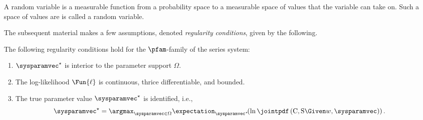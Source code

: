 \documentclass[../main.tex]{subfiles}
\begin{document}

A random variable is a measurable function from a probability space to a measurable space of values that the variable can take on.
Such a space of values are is called a random variable.



The subsequent material makes a few assumptions, denoted \emph{regularity conditions}, given by the following.
\begin{assumption}
\label{def:reg_cond}
The following regularity conditions hold for the $\pfam$-family of the series system:
\begin{enumerate}
    \item $\tparam\sysparamvec$ is interior to the parameter support $\Omega$.
    \item The log-likelihood $\Fun{\ell}$ is continuous, thrice differentiable, and bounded.
    \item{
        The true parameter value $\tparam\sysparamvec$ is identified, i.e.,
        \begin{equation}
            \tparam\sysparamvec = \argmax_{\sysparamvec \in \Omega} \expectation_{\tparam\sysparamvec}\!{\left(\ln \jointpdf\left(\rvcand, \sv \Given w, \sysparamvec\right)\right)}\,.
        \end{equation}
    }
\end{enumerate}
\end{assumption}
\end{document}
